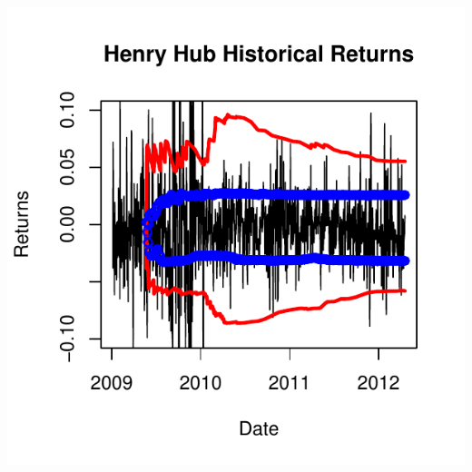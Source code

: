 \documentclass[10pt]{article}\usepackage[]{graphicx}\usepackage[]{color}
\makeatletter
\def\maxwidth{ %
  \ifdim\Gin@nat@width>\linewidth
    \linewidth
  \else
    \Gin@nat@width
  \fi
}
\newenvironment{knitrout}{}{} %
\makeatother
\begin{document}
\begin{knitrout}
{\centering \includegraphics[width=\maxwidth]{figure/unnamed-chunk-10} 

}



\end{knitrout}
\end{document}
